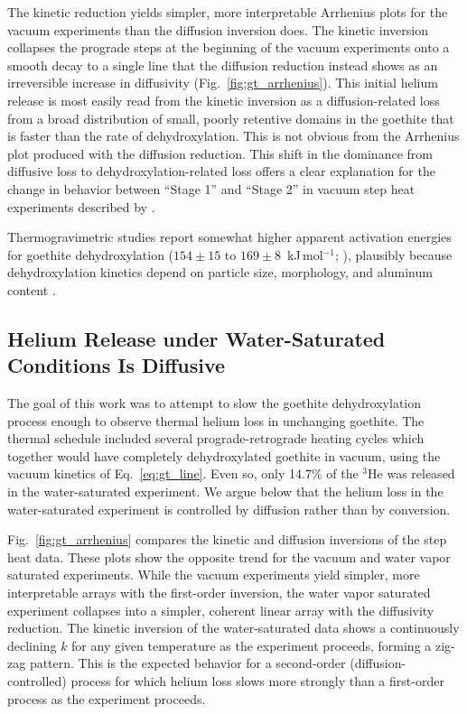 The kinetic reduction yields simpler, more interpretable Arrhenius plots for the vacuum experiments than the diffusion inversion 
does. The kinetic inversion collapses the
prograde steps at the beginning of the vacuum experiments onto a smooth decay to a single line that the diffusion reduction instead shows 
as an irreversible increase in diffusivity (Fig.~\ref{fig:gt_arrhenius}). This initial helium release is most easily read from 
the kinetic inversion as 
a diffusion-related loss from a broad distribution of small, poorly retentive domains in the goethite that is faster
than the rate of dehydroxylation. This is not obvious from the Arrhenius plot produced with the diffusion reduction. 
This shift in the dominance from diffusive loss to dehydroxylation-related loss offers a clear explanation for the 
change in behavior between ``Stage 1'' and ``Stage 2'' in vacuum step heat experiments described by \citet{farley2024}.

Thermogravimetric studies report somewhat higher apparent activation energies for goethite
dehydroxylation ($154\pm15$ to $169\pm8$~kJ\,mol$^{-1}$; \citealt{goss1987}), plausibly because
dehydroxylation kinetics depend on particle size, morphology, and aluminum content
\citep{langmuir1971,yapp1983,tardy1985,majzlannavrotsky2003}.

\subsection{Helium Release under Water-Saturated Conditions Is Diffusive}\label{sec:gt_hydro}

The goal of this work was to attempt to slow the goethite dehydroxylation process
enough to observe thermal helium loss in unchanging goethite.
The thermal schedule included several prograde-retrograde heating cycles
which together would have completely dehydroxylated goethite in vacuum, using the vacuum kinetics of
Eq.~\eqref{eq:gt_line}. Even so, only 14.7\% of the $^3$He was released in the water-saturated experiment.
We argue below that the helium loss in the water-saturated experiment is controlled by diffusion rather than by conversion.

Fig.~\ref{fig:gt_arrhenius} compares the kinetic and diffusion inversions of the step heat data.
These plots show the opposite trend for the vacuum and water vapor saturated experiments. While the vacuum experiments
yield simpler, more interpretable arrays with the first-order inversion, the water vapor saturated experiment collapses into a simpler, coherent
linear array with the diffusivity reduction. The kinetic inversion of the water-saturated data shows a continuously 
declining $k$ for any given temperature as the experiment proceeds, forming a zig-zag pattern. This is the expected behavior 
for a second-order (diffusion-controlled) process for which helium loss 
slows more strongly than a first-order process as the experiment proceeds. 

